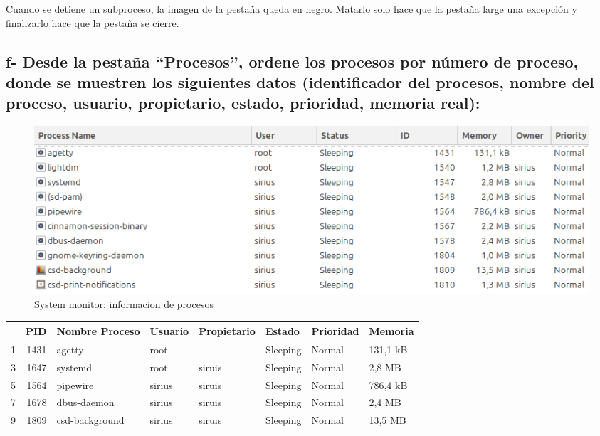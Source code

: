 \documentclass{article}
\begin{document}
 \begin{warn}[]
    Cuando se detiene un subproceso, la imagen de la pestaña queda en negro. Matarlo solo hace que la pestaña large una excepción
    y finalizarlo hace que la pestaña se cierre.
 \end{warn}



\subsection*{f- Desde la pestaña “Procesos”, ordene los procesos por número de proceso, donde se muestren los
siguientes datos (identificador del procesos, nombre del proceso, usuario, propietario, estado,
prioridad, memoria real):}

\begin{figure}[h]
  \centering
  \includegraphics[width=1\textwidth]{resources/ej2f.png}
  \caption{System monitor: informacion de procesos}
\end{figure}

\begin{table}[htbp]
  \centering
    \begin{tabular}{|rrllllll|}
    \toprule
    \rowcolor[rgb]{ .357,  .608,  .835} \multicolumn{1}{|l}{\textcolor[rgb]{ 1,  1,  1}{\textbf{Proceso}}} & \multicolumn{1}{l}{\textcolor[rgb]{ 1,  1,  1}{\textbf{PID}}} & \textcolor[rgb]{ 1,  1,  1}{\textbf{Nombre Proceso}} & \textcolor[rgb]{ 1,  1,  1}{\textbf{Usuario}} & \textcolor[rgb]{ 1,  1,  1}{\textbf{Propietario}} & \textcolor[rgb]{ 1,  1,  1}{\textbf{Estado}} & \textcolor[rgb]{ 1,  1,  1}{\textbf{Prioridad}} & \textcolor[rgb]{ 1,  1,  1}{\textbf{Memoria}} \\
    \midrule
    \rowcolor[rgb]{ .867,  .922,  .969} 1     & 1431  & agetty & root  & -     & Sleeping & Normal & 131,1 kB \\
    \midrule
    3     & 1647  & systemd & root  & siruis & Sleeping & Normal & 2,8 MB \\
    \midrule
    \rowcolor[rgb]{ .867,  .922,  .969} 5     & 1564  & pipewire & sirius & siruis & Sleeping & Normal & 786,4 kB \\
    \midrule
    7     & 1678  & dbus-daemon & sirius & siruis & Sleeping & Normal & 2,4 MB \\
    \midrule
    \rowcolor[rgb]{ .867,  .922,  .969} 9     & 1809  & csd-background & sirius & siruis & Sleeping & Normal & 13,5 MB \\
    \bottomrule
    \end{tabular}%
  \label{tab:addlabel}%
\end{table}%
\end{document}

